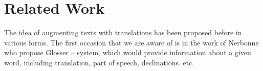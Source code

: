 
\section{Related Work}

The idea of augmenting texts with translations has been proposed before in various forms. The first occasion that we are aware of is in the work of Nerbonne \cite{Nerb99-Assistant} who propose Glosser -- system, which would provide information about a given word, including translation, part of speech, declinations. etc. 




